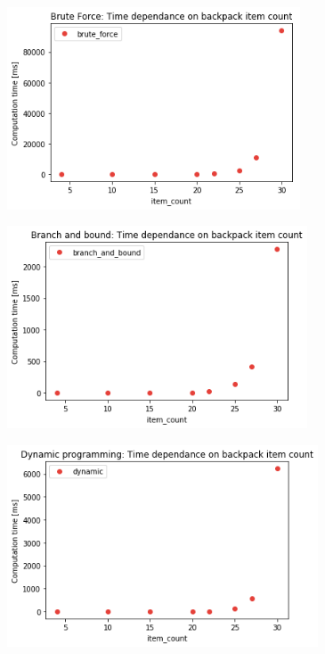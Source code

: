 \documentclass[a4paper,10pt,twocolumn]{article}
\begin{document}
\begin{figure}[H]
  \begin{center}
    \includegraphics[height=6cm]{graphs/bruteforce_speed.png}
  \end{center}
\end{figure}

\begin{figure}[H]
  \begin{center}
    \includegraphics[height=6cm]{graphs/bnb_speed.png}
  \end{center}
\end{figure}


\begin{figure}[H]
  \begin{center}
    \includegraphics[height=6cm]{graphs/dynamic_speed.png}
  \end{center}
\end{figure}
\end{document}
